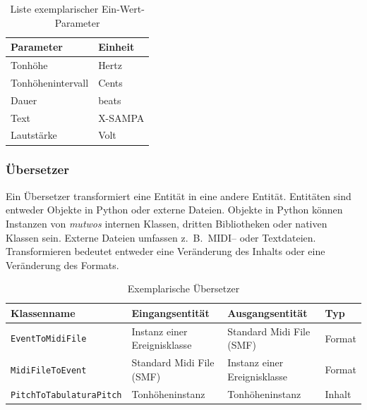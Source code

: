 \documentclass[12pt,a4paper,ngerman]{article}
\begin{document}
\begin{table}[h!]
    \begin{center}
        \begin{tabular}{l l} 
            \hline
            Parameter & Einheit \\ [0.5ex] 
            \hline\hline
            Tonhöhe & Hertz \\ 
            Tonhöhenintervall & Cents \\ 
            Dauer & beats \\ 
            Text & X-SAMPA\footnotemark \\ 
            Lautstärke & Volt \\ [1ex] 
            \hline
        \end{tabular}
    \end{center}

    \caption{Liste exemplarischer Ein-Wert-Parameter}
\end{table}


\subsubsection{Übersetzer}

Ein Übersetzer transformiert eine Entität in eine andere Entität.
Entitäten sind entweder Objekte in Python oder externe Dateien.
Objekte in Python können Instanzen von \emph{mutwos} internen Klassen, dritten Bibliotheken oder nativen Klassen sein.
Externe Dateien umfassen z.~B.\ MIDI-- oder Textdateien.
Transformieren bedeutet entweder eine Veränderung des Inhalts oder eine Veränderung des Formats.


\begin{table}[h!]
    \begin{center}
        \smaller
        \begin{tabular}{l l l l} 
            \hline
            Klassenname & Eingangsentität & Ausgangsentität & Typ \\ [0.5ex] 
            \hline\hline
            \texttt{EventToMidiFile} & Instanz einer Ereignisklasse & Standard Midi File (SMF) & Format \\ 
            \texttt{MidiFileToEvent} & Standard Midi File (SMF) & Instanz einer Ereignisklasse & Format \\ 
            \texttt{PitchToTabulaturaPitch} & Tonhöheninstanz & Tonhöheninstanz & Inhalt \\ [1ex] 
            \hline
        \end{tabular}

    \end{center}
    \caption{Exemplarische Übersetzer}
\end{table}
\end{document}

